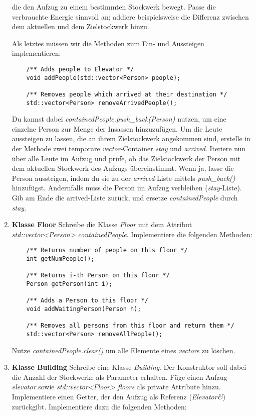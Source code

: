 \documentclass[
  accentcolor=tud1c,	%
  colorbacktitle,		%
  inverttitle,			%
  german,				%
  twoside
]{tudexercise}
\begin{document}
\begin{enumerate}
die den Aufzug zu einem bestimmten Stockwerk bewegt.
Passe die verbrauchte Energie sinnvoll an; addiere beispielsweise die Differenz zwischen dem aktuellen und dem Zielstockwerk hinzu.

Als letztes müssen wir die Methoden zum Ein- und Aussteigen implementieren:
\begin{lstlisting}
	/** Adds people to Elevator */
	void addPeople(std::vector<Person> people);

	/** Removes people which arrived at their destination */
	std::vector<Person> removeArrivedPeople();
\end{lstlisting} 

Du kannst dabei \emph{containedPeople.push\_back(Person)} nutzen, um eine einzelne Person zur Menge der Insassen hinzuzufügen. 
Um die Leute aussteigen zu lassen, die an ihrem Zielstockwerk angekommen sind, erstelle in der Methode zwei temporäre \emph{vector}-Container   \emph{stay} und \emph{arrived}. 
Iteriere nun über alle Leute im Aufzug und prüfe, ob das Zielstockwerk der Person mit dem aktuellen Stockwerk des Aufzugs übereinstimmt.
Wenn ja, lasse die Person aussteigen, indem du sie zu der \emph{arrived}-Liste mittels \emph{push\_back()} hinzufügst.
Andernfalls muss die Person im Aufzug verbleiben (\emph{stay}-Liste). 
Gib am Ende die arrived-Liste zurück, und ersetze \emph{containedPeople} durch \emph{stay}.

\item \textbf{Klasse Floor}
Schreibe die Klasse \emph{Floor} mit dem Attribut \emph{std::vector<Person> containedPeople}.
Implementiere die folgenden Methoden:

\begin{lstlisting}
	/** Returns number of people on this floor */
	int getNumPeople();
	
	/** Returns i-th Person on this floor */
	Person getPerson(int i);
	
	/** Adds a Person to this floor */
	void addWaitingPerson(Person h);
	
	/** Removes all persons from this floor and return them */
	std::vector<Person> removeAllPeople();
\end{lstlisting}

Nutze \emph{containedPeople.clear()} um alle Elemente eines \emph{vector}s zu löschen.

\item\textbf{Klasse Building}
Schreibe eine Klasse \emph{Building}.
Der Konstruktor soll dabei die Anzahl der Stockwerke als Parameter erhalten.
Füge einen Aufzug \emph{elevator} sowie \emph{std::vector<Floor> floors} als private Attribute hinzu.
Implementiere einen Getter, der den Aufzug als Referenz (\emph{Elevator\&}) zurückgibt.
Implementiere dazu die folgenden Methoden:


\end{enumerate}
\end{document}
